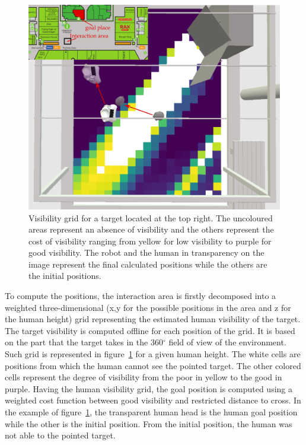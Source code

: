 \documentclass[a4paper,11pt,twoside]{StyleThese}
\begin{document}
\begin{figure}[ht!]
	\centering
	\includegraphics[scale=0.3]{figures/chapter3/grid_map.png}
	\caption{\label{fig:chap3_svp_grid} Visibility grid for a target located at the top right. The uncoloured areas represent an absence of visibility and the others represent the cost of visibility ranging from yellow for low visibility to purple for good visibility. The robot and the human in transparency on the image represent the final calculated positions while the others are the initial positions. }
\end{figure}

To compute the positions, the interaction area is firstly decomposed into a weighted three-dimensional (x,y for the possible positions in the area and z for the human height) grid representing the estimated human visibility of the target. The target visibility is computed offline for each position of the grid. It is based on the part that the target takes in the 360${^\circ}$ field of view of the environment. Such grid is represented in figure~\ref{fig:chap3_svp_grid} for a given human height. The white cells are positions from which the human cannot see the pointed target. The other colored cells represent the degree of visibility from the poor in yellow to the good in purple. Having the human visibility grid, the goal position is computed using a weighted cost function between good visibility and restricted distance to cross. In the example of figure~\ref{fig:chap3_svp_grid}, the transparent human head is the human goal position while the other is the initial position. From the initial position, the human was not able to the pointed target. 
\end{document}
